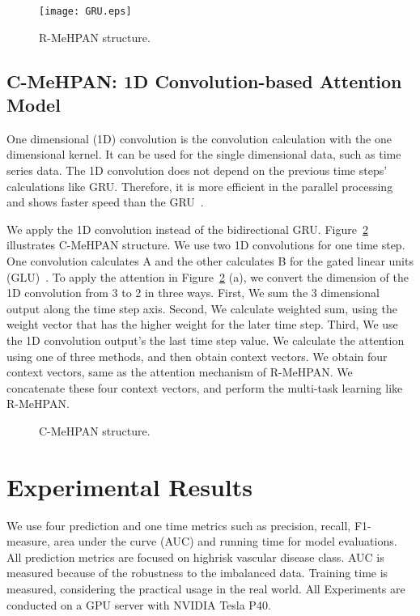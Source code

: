 \documentclass{article}
\begin{document}
\begin{figure}[t]
\centering
  \texttt{[image: GRU.eps]}    
  \caption{R-MeHPAN structure.}
  \label{fig::gru}
\end{figure}





 

\subsection{C-MeHPAN: 1D Convolution-based Attention Model}
One dimensional (1D) convolution is the convolution calculation with the one dimensional kernel. It can be used for the single dimensional data, such as time series data. The 1D convolution does not depend on the previous time steps’ calculations like GRU. Therefore, it is more efficient in the parallel processing and shows faster speed than the GRU~\cite{kim2014convolutional}.

We apply the 1D convolution instead of the bidirectional GRU. Figure~\ref{fig::1-d} illustrates C-MeHPAN structure. We use two 1D convolutions for one time step. One convolution calculates A and the other calculates B for the gated linear units (GLU)~\cite{gehring2017convolutional, glu}. To apply the attention in Figure~\ref{fig::1-d} (a), we convert the dimension of the 1D convolution from 3 to 2 in three ways. 
First, We sum the 3 dimensional output along the time step axis. 
Second, We calculate weighted sum, using the weight vector that has the higher weight for the later time step.  
Third, We use the 1D convolution output’s the last time step value. 
We calculate the attention using one of three methods, and then obtain context vectors. 
We obtain four context vectors, same as the attention mechanism of R-MeHPAN. We concatenate these four context vectors, and perform the multi-task learning like R-MeHPAN. 


\begin{figure}[t]
\centering
  \caption{C-MeHPAN structure.}
  \label{fig::1-d}
\end{figure}




\section{Experimental Results}
\label{Experiments}
We use four prediction and one time metrics such as precision, recall, F1-measure, area under the curve (AUC) and running time for model evaluations. 
All prediction metrics are focused on highrisk vascular disease class. AUC is measured because of the robustness to the imbalanced data. Training time is measured, considering the practical usage in the real world. All Experiments are conducted on a GPU server with NVIDIA Tesla P40.
\end{document}
